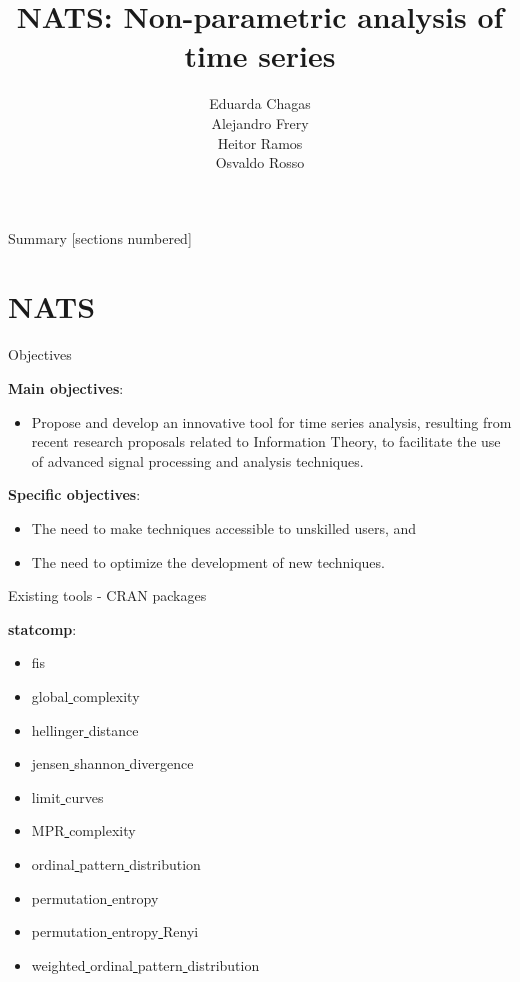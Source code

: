 \documentclass[10pt]{beamer}
\title{NATS: Non-parametric analysis of time series}
\date{}
\author{Eduarda Chagas \\ Alejandro Frery \\ Heitor Ramos \\ Osvaldo Rosso}
\institute{UFMG -- Wisemap \\
eduarda.chagas@dcc.ufmg.br}
\begin{document}
\maketitle

\begin{frame}{Summary}
  [sections numbered]
  \tableofcontents[hideallsubsections]
\end{frame}

\section{NATS}

\begin{frame}[fragile]{Objectives}
    
    \textbf{Main objectives}:
    
    \begin{itemize}
        \item Propose and develop an innovative tool for time series analysis, resulting from recent research proposals related to Information Theory, to facilitate the use of advanced signal processing and analysis techniques.
    \end{itemize}
    
    \textbf{Specific objectives}:
    
    \begin{itemize}
        \item The need to make techniques accessible to unskilled users, and
        \item The need to optimize the development of new techniques.
    \end{itemize}

\end{frame}

\begin{frame}[fragile]{Existing tools - CRAN packages}
    
    \textbf{statcomp}:
            \begin{itemize}
                \item fis
                \item global\underline{ } complexity
                \item hellinger\underline{ }distance
                \item jensen\underline{  }shannon\underline{ }divergence
                \item limit\underline{ }curves
                \item MPR\underline{ }complexity
                \item ordinal\underline{ }pattern\underline{ }distribution
                \item permutation\underline{ }entropy
                \item permutation\underline{ }entropy\underline{ }Renyi
                \item weighted\underline{ }ordinal\underline{ }pattern\underline{ }distribution
            \end{itemize}
        
\end{frame}
\end{document}
